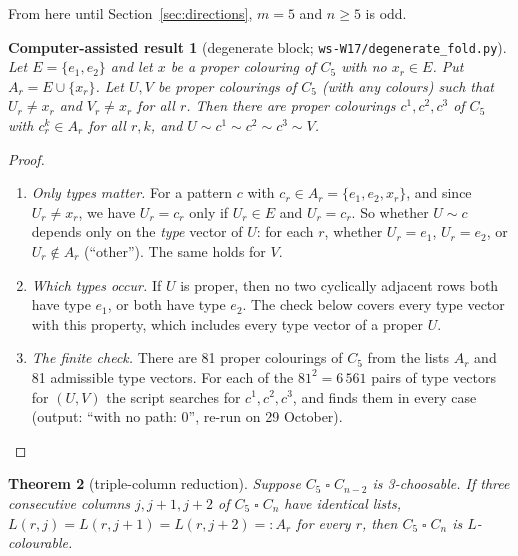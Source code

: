 \documentclass[11pt]{article}
\theoremstyle{plain}
\newtheorem{theorem}{Theorem}[section]
\newtheorem{computed}[theorem]{Computer-assisted result}
\theoremstyle{definition}
\theoremstyle{remark}
\newcommand{\T}{\mathbin{\square}}
\newcommand{\script}[1]{\texttt{#1}}
\newenvironment{steps}[1][]{\begin{enumerate}[label=\textbf{Step \arabic*.},leftmargin=4.4em,itemsep=0.35em,#1]}{\end{enumerate}}
\begin{document}
From here until Section~\ref{sec:directions}, $m = 5$ and $n \ge 5$ is odd.

\begin{computed}[degenerate block; \script{ws-W17/degenerate\_fold.py}]\label{degen}
Let $E = \{e_1, e_2\}$ and let $x$ be a proper colouring of $C_5$ with no $x_r \in E$. Put $A_r = E \cup \{x_r\}$. Let $U, V$
be proper colourings of $C_5$ (with any colours) such that $U_r \ne x_r$ and $V_r \ne x_r$ for all $r$. Then there are
proper colourings $c^1, c^2, c^3$ of $C_5$ with $c^k_r \in A_r$ for all $r, k$, and $U \sim c^1 \sim c^2 \sim c^3 \sim V$.
\end{computed}

\begin{proof}
\begin{steps}
\item \emph{Only types matter.} For a pattern $c$ with $c_r \in A_r = \{e_1, e_2, x_r\}$, and since $U_r \ne x_r$, we have
$U_r = c_r$ only if $U_r \in E$ and $U_r = c_r$. So whether $U \sim c$ depends only on the \emph{type} vector of $U$: for
each $r$, whether $U_r = e_1$, $U_r = e_2$, or $U_r \notin A_r$ (``other''). The same holds for $V$.
\item \emph{Which types occur.} If $U$ is proper, then no two cyclically adjacent rows both have type $e_1$, or both have
type $e_2$. The check below covers every type vector with this property, which includes every type vector of a proper
$U$.
\item \emph{The finite check.} There are 81 proper colourings of $C_5$ from the lists $A_r$ and 81 admissible type
vectors. For each of the $81^2 = 6\,561$ pairs of type vectors for $(U, V)$ the script searches for $c^1, c^2, c^3$, and
finds them in every case (output: ``with no path: 0'', re-run on 29 October). \qedhere
\end{steps}
\end{proof}

\begin{theorem}[triple-column reduction]\label{triple}
Suppose $C_5 \T C_{n-2}$ is 3-choosable. If three consecutive columns $j, j+1, j+2$ of $C_5 \T C_n$ have identical lists,
$L(r, j) = L(r, j+1) = L(r, j+2) =: A_r$ for every $r$, then $C_5 \T C_n$ is $L$-colourable.
\end{theorem}
\end{document}
